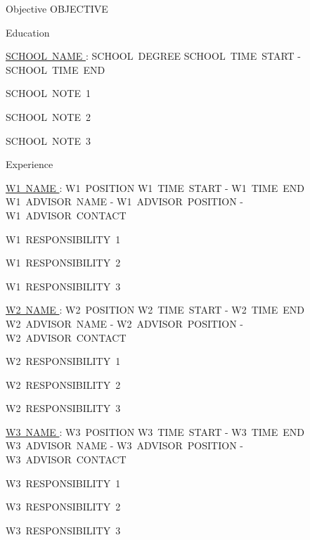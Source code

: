 \documentclass{resume} %
\begin{document}
  \begin{rSection}{Objective}
    OBJECTIVE
  \end{rSection}

  \begin{rSection}{Education}

    \begin{rSubsection}{\underline{ SCHOOL~NAME }: SCHOOL~DEGREE }{ SCHOOL~TIME~START - SCHOOL~TIME~END }{}
      \item SCHOOL~NOTE~1
      \item SCHOOL~NOTE~2
      \item SCHOOL~NOTE~3
    \end{rSubsection}

  \end{rSection}

  \begin{rSection}{Experience}

    \begin{rSubsection}{\underline{ W1~NAME }: W1~POSITION }{ W1~TIME~START - W1~TIME~END }{ W1~ADVISOR~NAME - W1~ADVISOR~POSITION - W1~ADVISOR~CONTACT }
      \item W1~RESPONSIBILITY~1
      \item W1~RESPONSIBILITY~2
      \item W1~RESPONSIBILITY~3
    \end{rSubsection}

    \begin{rSubsection}{\underline{ W2~NAME }: W2~POSITION }{ W2~TIME~START - W2~TIME~END }{ W2~ADVISOR~NAME - W2~ADVISOR~POSITION - W2~ADVISOR~CONTACT }
      \item W2~RESPONSIBILITY~1
      \item W2~RESPONSIBILITY~2
      \item W2~RESPONSIBILITY~3
    \end{rSubsection}

    \begin{rSubsection}{\underline{ W3~NAME }: W3~POSITION }{ W3~TIME~START - W3~TIME~END }{ W3~ADVISOR~NAME - W3~ADVISOR~POSITION - W3~ADVISOR~CONTACT }
      \item W3~RESPONSIBILITY~1
      \item W3~RESPONSIBILITY~2
      \item W3~RESPONSIBILITY~3
    \end{rSubsection}

  \end{rSection}
\end{document}
